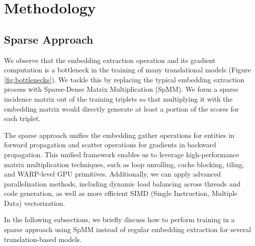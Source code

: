 \section{Methodology}
\subsection{Sparse Approach}
We observe that the embedding extraction operation and its gradient computation is a bottleneck in the training of many translational models (Figure \ref{fig:bottlenecks}). We tackle this by replacing the typical embedding extraction process with Sparse-Dense Matrix Multiplication (SpMM). We form a sparse incidence matrix out of the training triplets so that multiplying it with the embedding matrix would directly generate at least a portion of the scores for each triplet.

The sparse approach unifies the embedding gather operations for entities in forward propagation and scatter operations for gradients in backward propagation.
This unified framework enables us to leverage high-performance matrix multiplication techniques, such as loop unrolling, cache blocking, tiling, and WARP-level GPU primitives. Additionally, we can apply advanced parallelization methods, including dynamic load balancing across threads and code generation, as well as more efficient SIMD (Single Instruction, Multiple Data) vectorization.

In the following subsections, we briefly discuss how to perform training in a sparse approach using SpMM instead of regular embedding extraction for several translation-based models. 

